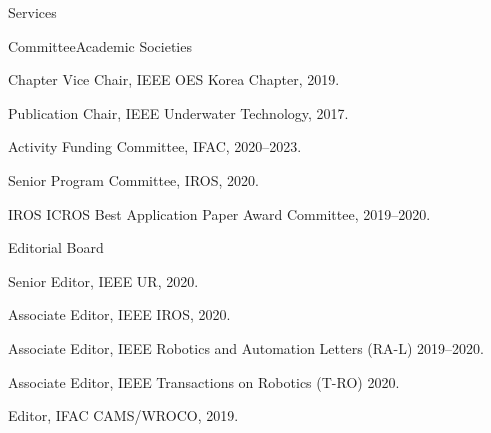 \begin{rSection}{Services}

\begin{rSubsection}{Committee}{}{Academic Societies}{}

  \item Chapter Vice Chair, IEEE OES Korea Chapter, 2019.


  \item Publication Chair, IEEE Underwater Technology, 2017.

  \item Activity Funding Committee, IFAC, 2020--2023.
  \item Senior Program Committee, IROS, 2020.
  \item IROS ICROS Best Application Paper Award Committee, 2019--2020.
\end{rSubsection}

%

\begin{rSubsection}{Editorial Board}{}{}{}
  \item Senior Editor, IEEE UR, 2020.
  \item Associate Editor, IEEE IROS, 2020.
  \item Associate Editor, IEEE Robotics and Automation Letters (RA-L) 2019--2020.
  \item Associate Editor, IEEE Transactions on Robotics (T-RO) 2020.
  \item Editor, IFAC CAMS/WROCO, 2019.
\end{rSubsection}


\end{rSection}
